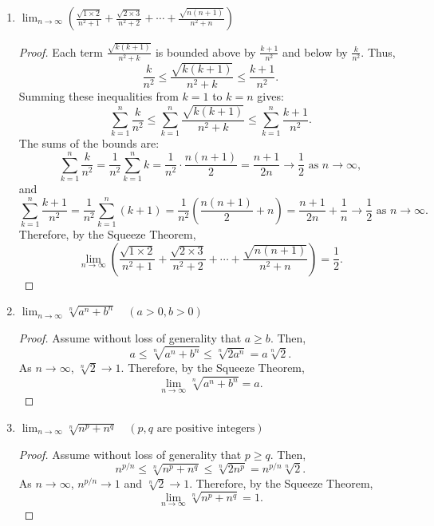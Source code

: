 \begin{solution}
\begin{enumerate}
    \item $\lim_{n \to \infty}\left(\frac{\sqrt{1 \times 2}}{n^{2}+1}+\frac{\sqrt{2 \times 3}}{n^{2}+2}+\cdots+\frac{\sqrt{n(n+1)}}{n^{2}+n}\right)$
    \begin{proof}
    Each term $\frac{\sqrt{k(k+1)}}{n^2 + k}$ is bounded above by $\frac{k+1}{n^2}$ and below by $\frac{k}{n^2}$. Thus,
    \[
    \frac{k}{n^2} \leq \frac{\sqrt{k(k+1)}}{n^2 + k} \leq \frac{k+1}{n^2}.
    \]
    Summing these inequalities from $k=1$ to $k=n$ gives:
    \[
    \sum_{k=1}^{n} \frac{k}{n^2} \leq \sum_{k=1}^{n} \frac{\sqrt{k(k+1)}}{n^2 + k} \leq \sum_{k=1}^{n} \frac{k+1}{n^2}.
    \]
    The sums of the bounds are:
    \[
    \sum_{k=1}^{n} \frac{k}{n^2} = \frac{1}{n^2} \sum_{k=1}^{n} k = \frac{1}{n^2} \cdot \frac{n(n+1)}{2} = \frac{n+1}{2n} \to \frac{1}{2} \text{ as } n \to \infty,
    \]
    and
    \[
    \sum_{k=1}^{n} \frac{k+1}{n^2} = \frac{1}{n^2} \sum_{k=1}^{n} (k+1) = \frac{1}{n^2} \left(\frac{n(n+1)}{2} + n\right) = \frac{n+1}{2n} + \frac{1}{n} \to \frac{1}{2} \text{ as } n \to \infty.
    \]
    Therefore, by the Squeeze Theorem,
    \[
    \lim_{n \to \infty} \left(\frac{\sqrt{1 \times 2}}{n^2 + 1} + \frac{\sqrt{2 \times 3}}{n^2 + 2} + \cdots + \frac{\sqrt{n(n+1)}}{n^2 + n}\right) = \frac{1}{2}.
    \]
    \end{proof}

    \item $\lim_{n \to \infty} \sqrt[n]{a^{n}+b^{n}} \quad(a>0, b>0)$
    \begin{proof}
    Assume without loss of generality that $a \geq b$. Then,
    \[
    a \leq \sqrt[n]{a^n + b^n} \leq \sqrt[n]{2a^n} = a \sqrt[n]{2}.
    \]
    As $n \to \infty$, $\sqrt[n]{2} \to 1$. Therefore, by the Squeeze Theorem,
    \[
    \lim_{n \to \infty} \sqrt[n]{a^n + b^n} = a.
    \]
    \end{proof}

    \item $\lim_{n \to \infty} \sqrt[n]{n^{p}+n^{q}} \quad(p, q \text{ are positive integers})$
    \begin{proof}
    Assume without loss of generality that $p \geq q$. Then,
    \[
    n^{p/n} \leq \sqrt[n]{n^p + n^q} \leq \sqrt[n]{2n^p} = n^{p/n} \sqrt[n]{2}.
    \]
    As $n \to \infty$, $n^{p/n} \to 1$ and $\sqrt[n]{2} \to 1$. Therefore, by the Squeeze Theorem,
    \[
    \lim_{n \to \infty} \sqrt[n]{n^p + n^q} = 1.
    \]
    \end{proof}


\end{enumerate}
\end{solution}
